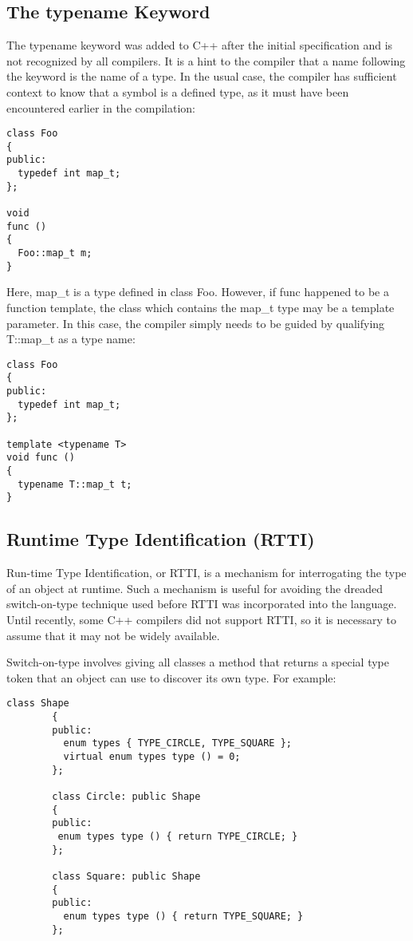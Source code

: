 \subsection{The typename Keyword}

The typename keyword was added to C++ after the initial specification and is not recognized by all compilers. It is a hint to the compiler that a name following the keyword is the name of a type. In the usual case, the compiler has sufficient context to know that a symbol is a defined type, as it must have been encountered earlier in the compilation: 

\begin{Verbatim}[frame=single]
class Foo
{
public:
  typedef int map_t;
};

void
func ()
{
  Foo::map_t m;
}
\end{Verbatim}

Here, map\_{}t is a type defined in class Foo. However, if func happened to 
be a function template, the class which contains the map\_{}t type may be a 
template parameter. In this case, the compiler simply needs to be guided by 
qualifying T::map\_{}t as a type name:

\begin{Verbatim}[frame=single]
class Foo
{
public:
  typedef int map_t;
};

template <typename T>
void func ()
{
  typename T::map_t t;
}
\end{Verbatim}

\subsection{Runtime Type Identification (RTTI)}

Run-time Type Identification, or RTTI, is a mechanism for interrogating the type of an object at runtime. Such a mechanism is useful for avoiding the dreaded switch-on-type technique used before RTTI was incorporated into the language. Until recently, some C++ compilers did not support RTTI, so it is necessary to assume that it may not be widely available.

Switch-on-type involves giving all classes a method that returns a special type token that an object can use to discover its own type. For example: 

\begin{Verbatim}[frame=single]
        class Shape
        {
        public:
          enum types { TYPE_CIRCLE, TYPE_SQUARE };
          virtual enum types type () = 0;
        };

        class Circle: public Shape
        {
        public:
         enum types type () { return TYPE_CIRCLE; }
        };

        class Square: public Shape
        {
        public:
          enum types type () { return TYPE_SQUARE; }
        };
\end{Verbatim}

